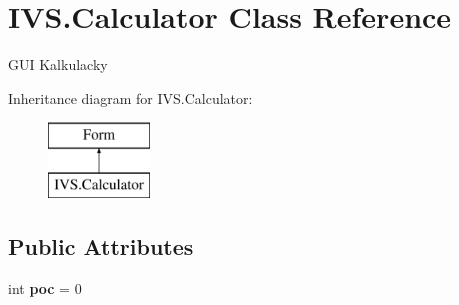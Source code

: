 \hypertarget{class_i_v_s_1_1_calculator}{}\section{I\+V\+S.\+Calculator Class Reference}
\label{class_i_v_s_1_1_calculator}


G\+UI Kalkulacky  


Inheritance diagram for I\+V\+S.\+Calculator\+:\begin{figure}[H]
\begin{center}
\leavevmode
\includegraphics[height=2.000000cm]{class_i_v_s_1_1_calculator}
\end{center}
\end{figure}
\subsection*{Public Attributes}
\begin{DoxyCompactItemize}
\item 
\mbox{\label{class_i_v_s_1_1_calculator_a898d9a8b3b00280f9cbd198206dcda5b}} 
int {\bfseries poc} = 0
\end{DoxyCompactItemize}
